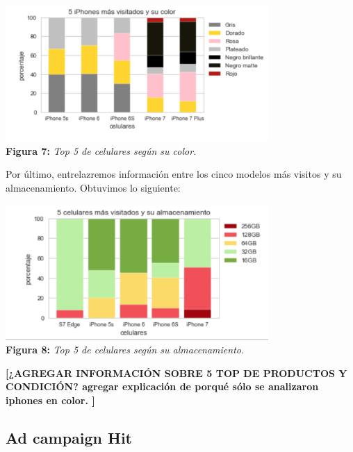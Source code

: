 \documentclass[titlepage,a4paper]{article}
\begin{document}
	\begin{center}
	\includegraphics[width=10cm]{cincoModMasVisitadosColor.jpg}\\
	\textbf{Figura 7:}  \textit{Top 5 de celulares según su color. }
	\end{center}
	Por último, entrelazremos información entre los cinco modelos más visitos y su almacenamiento. Obtuvimos lo siguiente: 
	\begin{center}
	\includegraphics[width=10cm] {cincoModMasVisitadosAlmacenamiento.jpg}\\
	\textbf{Figura 8:}  \textit{Top 5 de celulares según su almacenamiento. }
	\end{center}


\textbf{[¿AGREGAR INFORMACIÓN SOBRE 5 TOP DE PRODUCTOS Y CONDICIÓN?
agregar explicación de porqué sólo se analizaron iphones en color.
]}
	
	
	\subsection{Ad campaign Hit}
\end{document}
